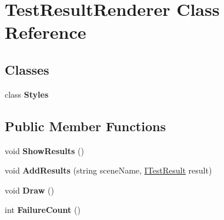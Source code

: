 \hypertarget{class_test_result_renderer}{}\section{Test\+Result\+Renderer Class Reference}
\label{class_test_result_renderer}
\subsection*{Classes}
\begin{DoxyCompactItemize}
\item 
class {\bfseries Styles}
\end{DoxyCompactItemize}
\subsection*{Public Member Functions}
\begin{DoxyCompactItemize}
\item 
\mbox{\label{class_test_result_renderer_aa25b0459fb54822ff8edfa76cd308b67}} 
void {\bfseries Show\+Results} ()
\item 
\mbox{\label{class_test_result_renderer_a06e5cf0c78c6a242885d2723052b4c23}} 
void {\bfseries Add\+Results} (string scene\+Name, \hyperlink{interface_i_test_result}{I\+Test\+Result} result)
\item 
\mbox{\label{class_test_result_renderer_ada77097628454641e91eb02aed5a110b}} 
void {\bfseries Draw} ()
\item 
\mbox{\label{class_test_result_renderer_a952964922f9aa200f7dc8519737636c8}} 
int {\bfseries Failure\+Count} ()
\end{DoxyCompactItemize}

